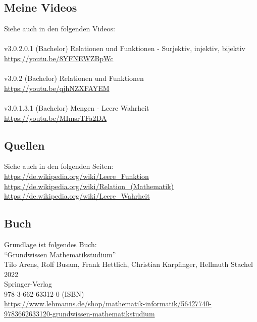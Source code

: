 \documentclass[a4paper]{amsart}
\theoremstyle{definition}
\begin{document}
\subsection*{Meine Videos}
Siehe auch in den folgenden Videos:\\
\\
v3.0.2.0.1 (Bachelor) Relationen und Funktionen - Surjektiv, injektiv, bijektiv\\
\url{https://youtu.be/8YFNEWZBpWc}\\
\\
v3.0.2 (Bachelor) Relationen und Funktionen\\
\url{https://youtu.be/qjhNZXFAYEM}\\
\\
v3.0.1.3.1 (Bachelor) Mengen - Leere Wahrheit\\
\url{https://youtu.be/MImsrTFa2DA}

\subsection*{Quellen}
Siehe auch in den folgenden Seiten:\\
\url{https://de.wikipedia.org/wiki/Leere_Funktion}\\
\url{https://de.wikipedia.org/wiki/Relation_(Mathematik)}\\
\url{https://de.wikipedia.org/wiki/Leere_Wahrheit}


\subsection*{Buch}
Grundlage ist folgendes Buch:\\
"`Grundwissen Mathematikstudium"'\\
Tilo Arens, Rolf Busam, Frank Hettlich, Christian Karpfinger, Hellmuth Stachel \\
2022\\
Springer-Verlag\\
978-3-662-63312-0 (ISBN)\\
{\tiny
   \url{https://www.lehmanns.de/shop/mathematik-informatik/56427740-9783662633120-grundwissen-mathematikstudium}}\\
\\
\end{document}
